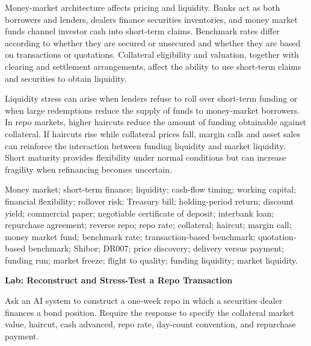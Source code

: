 Money-market architecture affects pricing and liquidity. Banks act as both borrowers and lenders, dealers finance securities inventories, and money market funds channel investor cash into short-term claims. Benchmark rates differ according to whether they are secured or unsecured and whether they are based on transactions or quotations. Collateral eligibility and valuation, together with clearing and settlement arrangements, affect the ability to use short-term claims and securities to obtain liquidity.

Liquidity stress can arise when lenders refuse to roll over short-term funding or when large redemptions reduce the supply of funds to money-market borrowers. In repo markets, higher haircuts reduce the amount of funding obtainable against collateral. If haircuts rise while collateral prices fall, margin calls and asset sales can reinforce the interaction between funding liquidity and market liquidity. Short maturity provides flexibility under normal conditions but can increase fragility when refinancing becomes uncertain.



Money market; short-term finance; liquidity; cash-flow timing; working capital; financial flexibility; rollover risk; Treasury bill; holding-period return; discount yield; commercial paper; negotiable certificate of deposit; interbank loan; repurchase agreement; reverse repo; repo rate; collateral; haircut; margin call; money market fund; benchmark rate; transaction-based benchmark; quotation-based benchmark; Shibor; DR007; price discovery; delivery versus payment; funding run; market freeze; flight to quality; funding liquidity; market liquidity.



\textbf{Lab: Reconstruct and Stress-Test a Repo Transaction}

Ask an AI system to construct a one-week repo in which a securities dealer finances a bond position. Require the response to specify the collateral market value, haircut, cash advanced, repo rate, day-count convention, and repurchase payment.

